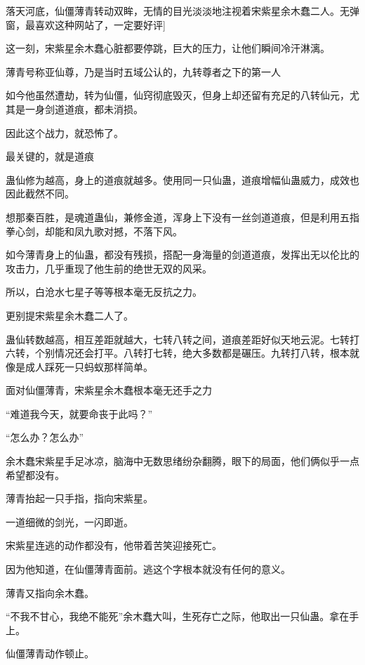 
\begin{this_body}

落天河底，仙僵薄青转动双眸，无情的目光淡淡地注视着宋紫星余木蠢二人。无弹窗，最喜欢这种网站了，一定要好评]

这一刻，宋紫星余木蠢心脏都要停跳，巨大的压力，让他们瞬间冷汗淋漓。

薄青号称亚仙尊，乃是当时五域公认的，九转尊者之下的第一人

如今他虽然遭劫，转为仙僵，仙窍彻底毁灭，但身上却还留有充足的八转仙元，尤其是一身剑道道痕，都未消损。

因此这个战力，就恐怖了。

最关键的，就是道痕

蛊仙修为越高，身上的道痕就越多。使用同一只仙蛊，道痕增幅仙蛊威力，成效也因此截然不同。

想那秦百胜，是魂道蛊仙，兼修金道，浑身上下没有一丝剑道道痕，但是利用五指拳心剑，却能和凤九歌对撼，不落下风。

如今薄青身上的仙蛊，都没有残损，搭配一身海量的剑道道痕，发挥出无以伦比的攻击力，几乎重现了他生前的绝世无双的风采。

所以，白沧水七星子等等根本毫无反抗之力。

更别提宋紫星余木蠢二人了。

蛊仙转数越高，相互差距就越大，七转八转之间，道痕差距好似天地云泥。七转打六转，个别情况还会打平。八转打七转，绝大多数都是碾压。九转打八转，根本就像是成人踩死一只蚂蚁那样简单。

面对仙僵薄青，宋紫星余木蠢根本毫无还手之力

“难道我今天，就要命丧于此吗？”

“怎么办？怎么办”

余木蠢宋紫星手足冰凉，脑海中无数思绪纷杂翻腾，眼下的局面，他们俩似乎一点希望都没有。

薄青抬起一只手指，指向宋紫星。

一道细微的剑光，一闪即逝。

宋紫星连逃的动作都没有，他带着苦笑迎接死亡。

因为他知道，在仙僵薄青面前。逃这个字根本就没有任何的意义。

薄青又指向余木蠢。

“不我不甘心，我绝不能死”余木蠢大叫，生死存亡之际，他取出一只仙蛊。拿在手上。

仙僵薄青动作顿止。


\end{this_body}
